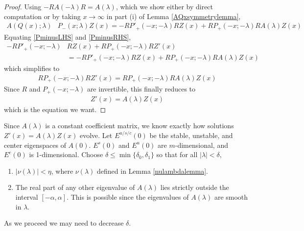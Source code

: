 \documentclass[thesis.tex]{subfiles}
\begin{document}
\begin{lemma}
\begin{proof}
Using $-R A(-\lambda) R = A(\lambda)$, which we show either by direct computation or by taking $x \rightarrow \infty$ in part (i) of Lemma \ref{AQxsymmetrylemma},
\begin{align}\label{PminusRHS}
A(Q(x); \lambda)&P_-(x; \lambda) Z(x) =  -R P'_+(-x; -\lambda) R Z(x) + R P_+(-x; -\lambda) R A(\lambda) Z(x)
\end{align}
Equating \cref{PminusLHS} and \cref{PminusRHS},
\begin{align*}
-RP'_+(-x; -\lambda)&R Z(x) + RP_+(-x; -\lambda)R Z'(x) \\
&= -R P'_+(-x; -\lambda) R Z(x) + R P_+(-x; -\lambda) R A(\lambda) Z(x)
\end{align*}
which simplifies to
\begin{align*}
RP_+(-x; -\lambda)R Z'(x) = R P_+(-x; -\lambda) R A(\lambda) Z(x)
\end{align*}
Since $R$ and $P_+(-x; -\lambda)$ are invertible, this finally reduces to 
\begin{align*}
Z'(x) = A(\lambda) Z(x)
\end{align*}
which is the equation we want.
\end{proof}
\end{lemma}

Since $A(\lambda)$ is a constant coefficient matrix, we know exactly how solutions $Z'(x) = A(\lambda)Z(x)$ evolve. Let $E^{u/s/c}(0)$ be the stable, unstable, and center eigenspaces of $A(0)$. $E^s(0)$ and $E^u(0)$ are $m$-dimensional, and $E^c(0)$ is 1-dimensional. Choose $\delta \leq \min\{\delta_0, \delta_1\}$ so that for all $|\lambda| < \delta$,
\begin{enumerate}
	\item $|\nu(\lambda)| < \eta$, where $\nu(\lambda)$ defined in Lemma \ref{nulambdalemma}.

	\item The real part of any other eigenvalue of $A(\lambda)$ lies strictly outside the interval $[-\alpha, \alpha]$. This is possible since the eigenvalues of $A(\lambda)$ are smooth in $\lambda$.
\end{enumerate}
As we proceed we may need to decrease $\delta$. 
\end{document}
